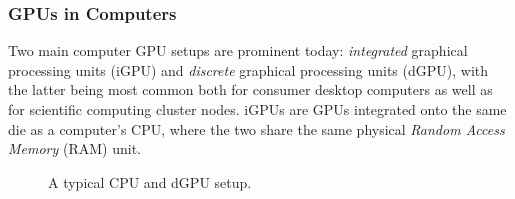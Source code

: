 \subsubsection{GPUs in Computers}

Two main computer GPU setups are prominent today: \textit{integrated} graphical processing units (iGPU) and \textit{discrete} graphical processing units (dGPU), with the latter being most common both for consumer desktop computers as well as for scientific computing cluster nodes.
iGPUs are GPUs integrated onto the same die as a computer's CPU, where the two share the same physical \textit{Random Access Memory} (RAM) unit.

\begin{figure}[h!]\label{figure:gpu-system}
\begin{center}
\caption{A typical CPU and dGPU setup.}
\end{center}
\end{figure}
